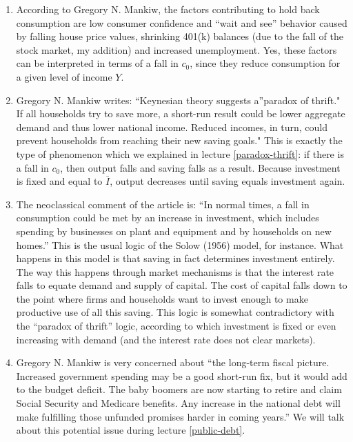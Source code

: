 \documentclass[]{book}
\theoremstyle{definition}
\theoremstyle{definition}
\theoremstyle{definition}
\theoremstyle{remark}
\begin{document}
\begin{enumerate}
\def\labelenumi{\arabic{enumi}.}
\item
  According to Gregory N. Mankiw, the factors contributing to hold back
  consumption are low consumer confidence and ``wait and see'' behavior
  caused by falling house price values, shrinking 401(k) balances (due
  to the fall of the stock market, my addition) and increased
  unemployment. Yes, these factors can be interpreted in terms of a fall
  in \(c_0\), since they reduce consumption for a given level of income
  \(Y\).
\item
  Gregory N. Mankiw writes: ``Keynesian theory suggests a''paradox of
  thrift." If all households try to save more, a short-run result could
  be lower aggregate demand and thus lower national income. Reduced
  incomes, in turn, could prevent households from reaching their new
  saving goals." This is exactly the type of phenomenon which we
  explained in lecture \ref{paradox-thrift}: if there is a fall in
  \(c_0\), then output falls and saving falls as a result. Because
  investment is fixed and equal to \(\bar{I}\), output decreases until
  saving equals investment again.
\item
  The neoclassical comment of the article is: ``In normal times, a fall
  in consumption could be met by an increase in investment, which
  includes spending by businesses on plant and equipment and by
  households on new homes.'' This is the usual logic of the Solow (1956)
  model, for instance. What happens in this model is that saving in fact
  determines investment entirely. The way this happens through market
  mechanisms is that the interest rate falls to equate demand and supply
  of capital. The cost of capital falls down to the point where firms
  and households want to invest enough to make productive use of all
  this saving. This logic is somewhat contradictory with the ``paradox
  of thrift'' logic, according to which investment is fixed or even
  increasing with demand (and the interest rate does not clear markets).
\item
  Gregory N. Mankiw is very concerned about ``the long-term fiscal
  picture. Increased government spending may be a good short-run fix,
  but it would add to the budget deficit. The baby boomers are now
  starting to retire and claim Social Security and Medicare benefits.
  Any increase in the national debt will make fulfilling those unfunded
  promises harder in coming years.'' We will talk about this potential
  issue during lecture \ref{public-debt}.
\end{enumerate}
\end{document}
